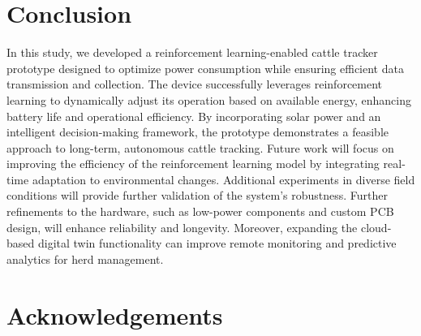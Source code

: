 \documentclass[10pt]{cai}
\begin{document}
\section{Conclusion}
In this study, we developed a reinforcement learning-enabled cattle tracker prototype designed to optimize power consumption while ensuring efficient data transmission and collection. The device successfully leverages reinforcement learning to dynamically adjust its operation based on available energy, enhancing battery life and operational efficiency. By incorporating solar power and an intelligent decision-making framework, the prototype demonstrates a feasible approach to long-term, autonomous cattle tracking.
Future work will focus on improving the efficiency of the reinforcement learning model by integrating real-time adaptation to environmental changes. Additional experiments in diverse field conditions will provide further validation of the system's robustness. Further refinements to the hardware, such as low-power components and custom PCB design, will enhance reliability and longevity. Moreover, expanding the cloud-based digital twin functionality can improve remote monitoring and predictive analytics for herd management.

\section*{Acknowledgements}

\printbibliography[heading=subbibintoc]
\end{document}
